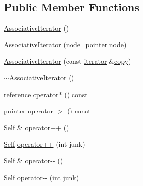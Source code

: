 \subsection*{Public Member Functions}
\begin{DoxyCompactItemize}
\item 
\hyperlink{structprism_1_1_associative_iterator_aa3820be28f7421449eb7334aa64a1c49}{Associative\+Iterator} ()
\item 
\hyperlink{structprism_1_1_associative_iterator_a5d1fcaa6ea1a58deb5802a58d9ebb8dc}{Associative\+Iterator} (\hyperlink{structprism_1_1_associative_iterator_a73a0ddce41b285bf48fb0ef3411f6557}{node\+\_\+pointer} node)
\item 
\hyperlink{structprism_1_1_associative_iterator_a152cedf6acccc8e4ad546a16447a442c}{Associative\+Iterator} (const \hyperlink{structprism_1_1_associative_iterator_a1c18ef8b4a02324bfdbf541b023ecc6b}{iterator} \&\hyperlink{namespaceprism_ae776f4cd825f79e7af1cf6ee1d90a209}{copy})
\item 
\hyperlink{structprism_1_1_associative_iterator_a24d17d692a4b78f0a8332449ab1ff99d}{$\sim$\+Associative\+Iterator} ()
\item 
\hyperlink{structprism_1_1_associative_iterator_aab7cac291580847e204cb7c8ca90ddc8}{reference} \hyperlink{structprism_1_1_associative_iterator_a75187c65867cab0cfc187dcbc41456e9}{operator$\ast$} () const 
\item 
\hyperlink{structprism_1_1_associative_iterator_a8fcf3ad67041397687eb5ae187312d17}{pointer} \hyperlink{structprism_1_1_associative_iterator_a64e845db1d51bd8cf83bae26a17f4bbb}{operator-\/$>$} () const 
\item 
\hyperlink{structprism_1_1_associative_iterator_af8bb51b69b4eca7c0ec7ba4887833877}{Self} \& \hyperlink{structprism_1_1_associative_iterator_a0930051edd8c13d9fd5b3f71f1e0f0ae}{operator++} ()
\item 
\hyperlink{structprism_1_1_associative_iterator_af8bb51b69b4eca7c0ec7ba4887833877}{Self} \hyperlink{structprism_1_1_associative_iterator_a781b8cbbbf43f0c5fe8abd63f36638c5}{operator++} (int junk)
\item 
\hyperlink{structprism_1_1_associative_iterator_af8bb51b69b4eca7c0ec7ba4887833877}{Self} \& \hyperlink{structprism_1_1_associative_iterator_a5954c73a236399a5faedfa27b1ae2118}{operator-\/-\/} ()
\item 
\hyperlink{structprism_1_1_associative_iterator_af8bb51b69b4eca7c0ec7ba4887833877}{Self} \hyperlink{structprism_1_1_associative_iterator_a061cedeb49bb827fd2594a8b9fb99d4e}{operator-\/-\/} (int junk)

\end{DoxyCompactItemize}
